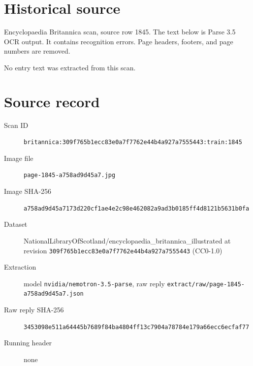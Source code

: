 \documentclass{article}
\begin{document}
\section*{Historical source}
Encyclopaedia Britannica scan, source row 1845. The text below is Parse 3.5 OCR output. It contains recognition errors.
Page headers, footers, and page numbers are removed.

No entry text was extracted from this scan.

\section*{Source record}
\begin{description}
\item[Scan ID] \texttt{britannica:309f765b1ecc83e0a7f7762e44b4a927a7555443:train:1845}
\item[Image file] \texttt{page-1845-a758ad9d45a7.jpg}
\item[Image SHA-256] \texttt{a758ad9d45a7173d220cf1ae4e2c98e462082a9ad3b0185ff4d8121b5631b0fa}
\item[Dataset] NationalLibraryOfScotland/encyclopaedia\_britannica\_illustrated at revision \texttt{309f765b1ecc83e0a7f7762e44b4a927a7555443} (CC0-1.0)
\item[Extraction] model \texttt{nvidia/nemotron-3.5-parse}, raw reply \texttt{extract/raw/page-1845-a758ad9d45a7.json}
\item[Raw reply SHA-256] \texttt{3453098e511a64445b7689f84ba4804ff13c7904a78784e179a66ecc6ecfaf77}

\item[Running header] none
\end{description}
\end{document}
